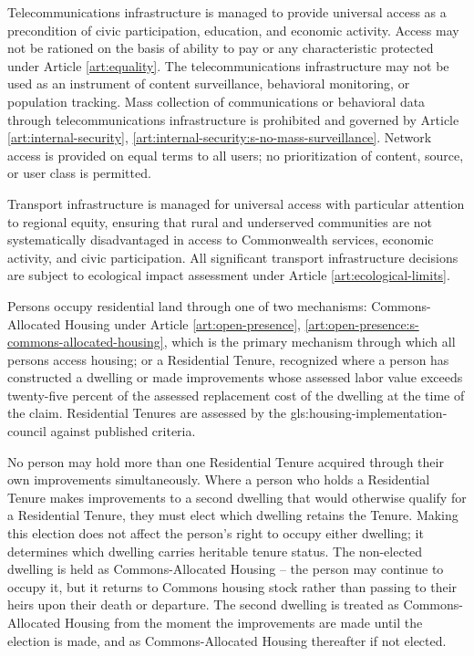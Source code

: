 Telecommunications infrastructure is managed to provide universal access as a precondition of civic participation, education, and economic activity. Access may not be rationed on the basis of ability to pay or any characteristic protected under Article \ref{art:equality}. The telecommunications infrastructure may not be used as an instrument of content surveillance, behavioral monitoring, or population tracking. Mass collection of communications or behavioral data through telecommunications infrastructure is prohibited and governed by Article \ref{art:internal-security}, \ref{art:internal-security:s-no-mass-surveillance}. Network access is provided on equal terms to all users; no prioritization of content, source, or user class is permitted.

Transport infrastructure is managed for universal access with particular attention to regional equity, ensuring that rural and underserved communities are not systematically disadvantaged in access to Commonwealth services, economic activity, and civic participation. All significant transport infrastructure decisions are subject to ecological impact assessment under Article \ref{art:ecological-limits}.


Persons occupy residential land through one of two mechanisms: Commons-Allocated Housing under Article \ref{art:open-presence}, \ref{art:open-presence:s-commons-allocated-housing}, which is the primary mechanism through which all persons access housing; or a Residential Tenure, recognized where a person has constructed a dwelling or made improvements whose assessed labor value exceeds twenty-five percent of the assessed replacement cost of the dwelling at the time of the claim. Residential Tenures are assessed by the \gls{gls:housing-implementation-council} against published criteria.

No person may hold more than one Residential Tenure acquired through their own improvements simultaneously. Where a person who holds a Residential Tenure makes improvements to a second dwelling that would otherwise qualify for a Residential Tenure, they must elect which dwelling retains the Tenure. Making this election does not affect the person's right to occupy either dwelling; it determines which dwelling carries heritable tenure status. The non-elected dwelling is held as Commons-Allocated Housing -- the person may continue to occupy it, but it returns to Commons housing stock rather than passing to their heirs upon their death or departure. The second dwelling is treated as Commons-Allocated Housing from the moment the improvements are made until the election is made, and as Commons-Allocated Housing thereafter if not elected.

